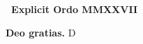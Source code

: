 \begin{center}
\textbf{\grecross \ Explicit Ordo MMXXVII \grecross} \par \textbf{Deo gratias.}
\newline
\vspace{+5em}
{}\fontsize{48}{52}\selectfont D
\end{center}




